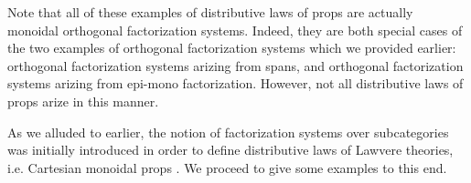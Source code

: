 Note that all of these examples of distributive laws of props are actually  monoidal orthogonal factorization systems.  Indeed, they are both special cases of the two examples of orthogonal factorization systems which we provided earlier: orthogonal factorization systems arizing from spans, and orthogonal factorization systems arizing from epi-mono factorization.   However, not all distributive laws of props arize in this manner.




 As we alluded to earlier,  the notion of factorization systems over subcategories was initially introduced in order to define distributive laws of Lawvere theories, i.e. Cartesian monoidal props \cite{lawvere}. We proceed to give some examples to this end.
%
%
%
%
%
%
%
%
%
%
